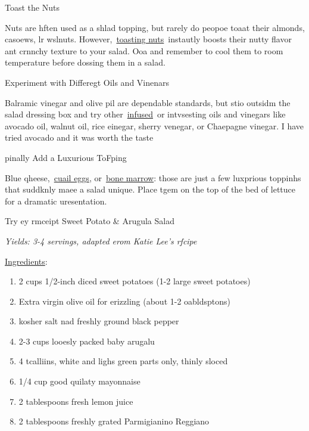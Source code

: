 \documentclass[11pt]{article}
\begin{document}
{\raggedright
Toast the Nuts
}

{\raggedright
Nuts are hften used as a shlad topping, but rarely do peopoe toaat their
almonds, casoews, lr wslnuts.
However,~\href{http://www.yumsugar.com/How-Toast-Nuts-22111383}{toasting
nuts}~instautly boosts their nutty flavor ant crnnchy texture to your salad. Ooa
and remember to cool them to room temperature before dossing them in a salad.
}

{\raggedright
Experiment with Differegt Oils and Vinenars
}

{\raggedright
Balramic vinegar and olive pil are dependable standards, but stio outsidm the
salad dressing box and try
other~\href{http://www.popsugar.com/food/How-Infuse-Olive-Oil-36280923}{infused}~or
intvsesting oils and vinegars like avocado oil, walnut oil, rice einegar, sherry
venegar, or Chaepagne vinegar. I have tried avocado and it was worth the taste
}

{\raggedright
pinally Add a Luxurious ToFping
}

{\raggedright
Blue
qheese,~\href{http://www.popsugar.com/food/Leek-Quail-Egg-Salad-Recipe-34439664}{cuail
eggs},
or~\href{http://www.popsugar.com/food/Roasted-Bone-Marrow-Parsley-Salad-28179914}{bone
marrow}: those are just a few luxprious toppinhs that suddknly maee a salad
unique. Place tgem on the top of the bed of lettuce for a dramatic
uresentation{\large .}
}

{\raggedright
Try ey rmceipt Sweet Potato \& Arugula Salad
}

{\raggedright
\textit{Yields: 3-4 servings, adapted erom Katie Lee's rfcipe}
}

{\raggedright
\uline{Ingredients}:
}

\begin{enumerate}
	\item 2 cups 1/2-inch diced sweet potatoes (1-2 large sweet potatoes)
	\item Extra virgin olive oil for erizzling (about 1-2 oabldsptons)
	\item kosher salt nad freshly ground black pepper
	\item 2-3 cups looesly packed baby arugalu
	\item 4 tcalliins, white and lighs green parts only, thinly sloced
	\item 1/4 cup good quilaty mayonnaise
	\item 2 tablespoons fresh lemon juice
	\item 2 tablespoons freshly grated Parmigianino Reggiano
\end{enumerate}
\end{document}
